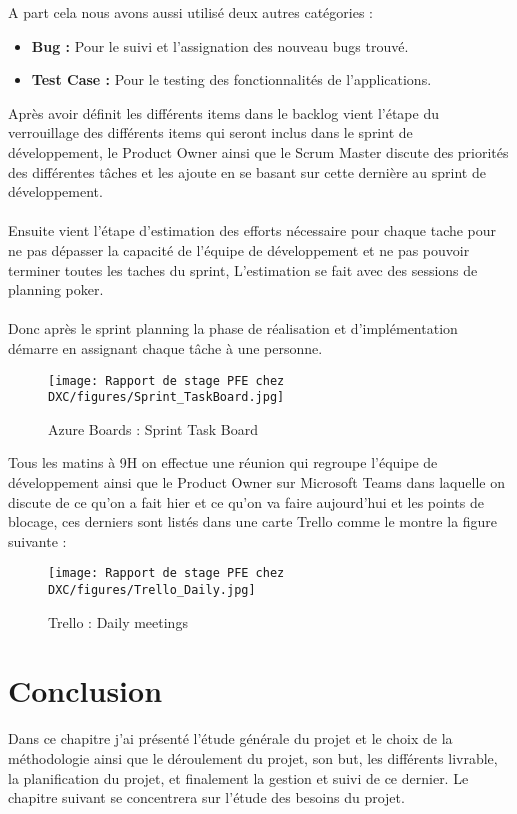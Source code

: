 \vspace{0.5cm}

A part cela nous avons aussi utilisé deux autres catégories :
\\

\begin{itemize}
  \item \textbf{Bug :} Pour le suivi et l’assignation des nouveau bugs trouvé.
  \item \textbf{Test Case :} Pour le testing des fonctionnalités de l’applications.
\end{itemize}

\vspace{\baselineskip}
Après avoir définit les différents items dans le backlog vient l'étape du verrouillage des différents items qui seront inclus dans le sprint de développement, le Product Owner ainsi que le Scrum Master discute des priorités des différentes tâches et les ajoute en se basant sur cette dernière au sprint de développement.
\\
\\
Ensuite vient l'étape d'estimation des efforts nécessaire pour chaque tache pour ne pas dépasser la capacité de l'équipe de développement et ne pas pouvoir terminer toutes les taches du sprint, L'estimation se fait avec des sessions de planning poker.
\\
\\
Donc après le sprint planning la phase de réalisation et d’implémentation démarre en assignant chaque tâche à une personne.


\begin{figure}[H]
    \centering
    \texttt{[image: Rapport de stage PFE chez DXC/figures/Sprint\_TaskBoard.jpg]}
    \caption{Azure Boards : Sprint Task Board}
\end{figure}

\newpage
Tous les matins à 9H on effectue une réunion qui regroupe l'équipe de développement ainsi que le Product Owner sur Microsoft Teams dans laquelle on discute de ce qu’on a fait hier et ce qu’on va faire aujourd’hui et les points de blocage, ces derniers sont listés dans une carte Trello comme le montre la figure suivante :

\begin{figure}[H]
    \centering
    \texttt{[image: Rapport de stage PFE chez DXC/figures/Trello\_Daily.jpg]}
    \caption{Trello : Daily meetings}
\end{figure}

\section{Conclusion}

Dans ce chapitre j’ai présenté l’étude générale du projet et le choix de la méthodologie ainsi
que le déroulement du projet, son but, les différents livrable, la planification du projet, et finalement la gestion et suivi de ce dernier. Le chapitre suivant se concentrera sur l’étude des besoins du projet.
